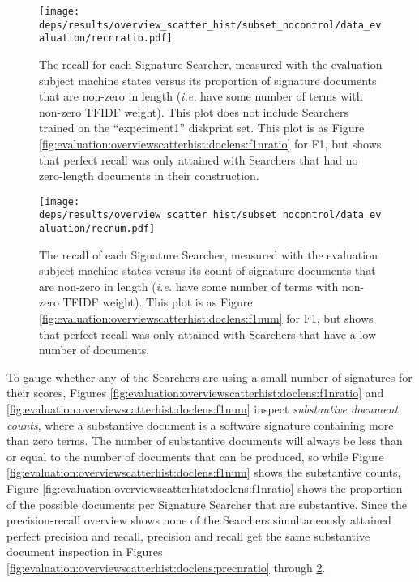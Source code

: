 \documentclass[11pt]{ucthesis}
\theoremstyle{plain}
\theoremstyle{definition}
\newcommand{\ie}{\emph{i.e.}\xspace}
\begin{document}
\begin{figure}
  \centering
  \texttt{[image: deps/results/overview\_scatter\_hist/subset\_nocontrol/data\_evaluation/recnratio.pdf]}
  \caption{\label{fig:evaluation:overviewscatterhist:doclens:recnratio}The recall for each Signature Searcher, measured with the evaluation subject machine states versus its proportion of signature documents that are non-zero in length (\ie have some number of terms with non-zero TFIDF weight).  This plot does not include Searchers trained on the ``experiment1'' diskprint set.  This plot is as Figure \ref{fig:evaluation:overviewscatterhist:doclens:f1nratio} for F1, but shows that perfect recall was only attained with Searchers that had no zero-length documents in their construction.}
\end{figure}

\begin{figure}
  \centering
  \texttt{[image: deps/results/overview\_scatter\_hist/subset\_nocontrol/data\_evaluation/recnum.pdf]}
  \caption{\label{fig:evaluation:overviewscatterhist:doclens:recnum}The recall of each Signature Searcher, measured with the evaluation subject machine states versus its count of signature documents that are non-zero in length (\ie have some number of terms with non-zero TFIDF weight).  This plot is as Figure \ref{fig:evaluation:overviewscatterhist:doclens:f1num} for F1, but shows that perfect recall was only attained with Searchers that have a low number of documents.}
\end{figure}

To gauge whether any of the Searchers are using a small number of signatures for their scores, Figures \ref{fig:evaluation:overviewscatterhist:doclens:f1nratio} and \ref{fig:evaluation:overviewscatterhist:doclens:f1num} inspect \emph{substantive document counts}, where a substantive document is a software signature containing more than zero terms.  The number of substantive documents will always be less than or equal to the number of documents that can be produced, so while Figure \ref{fig:evaluation:overviewscatterhist:doclens:f1num} shows the substantive counts, Figure \ref{fig:evaluation:overviewscatterhist:doclens:f1nratio} shows the proportion of the possible documents per Signature Searcher that are substantive.  Since the precision-recall overview shows none of the Searchers simultaneously attained perfect precision and recall, precision and recall get the same substantive document inspection in Figures \ref{fig:evaluation:overviewscatterhist:doclens:precnratio} through \ref{fig:evaluation:overviewscatterhist:doclens:recnum}.
\end{document}
